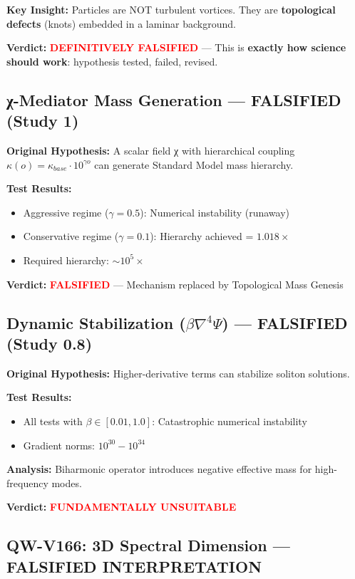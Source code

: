 \documentclass[11pt, a4paper]{article}
\theoremstyle{remark}
\begin{document}
\textbf{Key Insight:} Particles are NOT turbulent vortices. They are \textbf{topological defects} (knots) embedded in a laminar background.

\textbf{Verdict:} \textcolor{red}{\textbf{DEFINITIVELY FALSIFIED}} --- This is \textbf{exactly how science should work}: hypothesis tested, failed, revised.

\subsection{χ-Mediator Mass Generation --- FALSIFIED (Study 1)}

\textbf{Original Hypothesis:} A scalar field χ with hierarchical coupling $\kappa(o) = \kappa_{base} \cdot 10^{\gamma o}$ can generate Standard Model mass hierarchy.

\textbf{Test Results:}
\begin{itemize}
    \item Aggressive regime ($\gamma = 0.5$): Numerical instability (runaway)
    \item Conservative regime ($\gamma = 0.1$): Hierarchy achieved = $1.018\times$
    \item Required hierarchy: $\sim 10^5 \times$
\end{itemize}

\textbf{Verdict:} \textcolor{red}{\textbf{FALSIFIED}} --- Mechanism replaced by Topological Mass Genesis

\subsection{Dynamic Stabilization ($\beta\nabla^4\Psi$) --- FALSIFIED (Study 0.8)}

\textbf{Original Hypothesis:} Higher-derivative terms can stabilize soliton solutions.

\textbf{Test Results:}
\begin{itemize}
    \item All tests with $\beta \in [0.01, 1.0]$: Catastrophic numerical instability
    \item Gradient norms: $10^{30} - 10^{34}$
\end{itemize}

\textbf{Analysis:} Biharmonic operator introduces negative effective mass for high-frequency modes.

\textbf{Verdict:} \textcolor{red}{\textbf{FUNDAMENTALLY UNSUITABLE}}

\subsection{QW-V166: 3D Spectral Dimension --- FALSIFIED INTERPRETATION}
\end{document}
